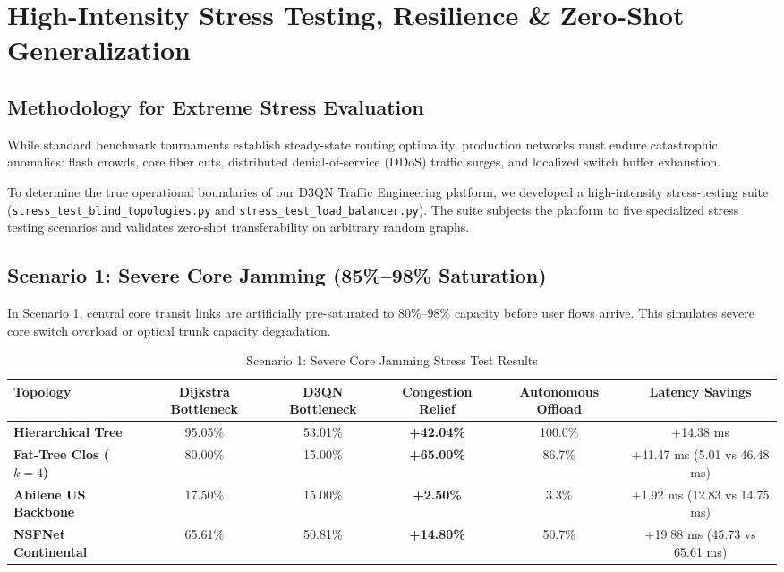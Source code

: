 \chapter{High-Intensity Stress Testing, Resilience \& Zero-Shot Generalization}
\label{chap:stress}

\section{Methodology for Extreme Stress Evaluation}
While standard benchmark tournaments establish steady-state routing optimality, production networks must endure catastrophic anomalies: flash crowds, core fiber cuts, distributed denial-of-service (DDoS) traffic surges, and localized switch buffer exhaustion. 

To determine the true operational boundaries of our D3QN Traffic Engineering platform, we developed a high-intensity stress-testing suite (\texttt{stress\_test\_blind\_topologies.py} and \texttt{stress\_test\_load\_balancer.py}). The suite subjects the platform to five specialized stress testing scenarios and validates zero-shot transferability on arbitrary random graphs.

\section{Scenario 1: Severe Core Jamming (85\%--98\% Saturation)}
In Scenario 1, central core transit links are artificially pre-saturated to $80\%$--$98\%$ capacity before user flows arrive. This simulates severe core switch overload or optical trunk capacity degradation.

\begin{table}[htbp]
\centering
\caption{Scenario 1: Severe Core Jamming Stress Test Results}
\label{tab:stress_scenario_1}
\small
\begin{tabularx}{\textwidth}{l c c c c c}
\toprule
\textbf{Topology} & \textbf{Dijkstra Bottleneck} & \textbf{D3QN Bottleneck} & \textbf{Congestion Relief} & \textbf{Autonomous Offload} & \textbf{Latency Savings} \\
\midrule
\textbf{Hierarchical Tree} & 95.05\% & 53.01\% & \textbf{+42.04\%} & 100.0\% & +14.38 ms \\
\textbf{Fat-Tree Clos ($k=4$)} & 80.00\% & 15.00\% & \textbf{+65.00\%} & 86.7\% & +41.47 ms (5.01 vs 46.48 ms) \\
\textbf{Abilene US Backbone} & 17.50\% & 15.00\% & \textbf{+2.50\%} & 3.3\% & +1.92 ms (12.83 vs 14.75 ms) \\
\textbf{NSFNet Continental} & 65.61\% & 50.81\% & \textbf{+14.80\%} & 50.7\% & +19.88 ms (45.73 vs 65.61 ms) \\
\bottomrule
\end{tabularx}
\end{table}

